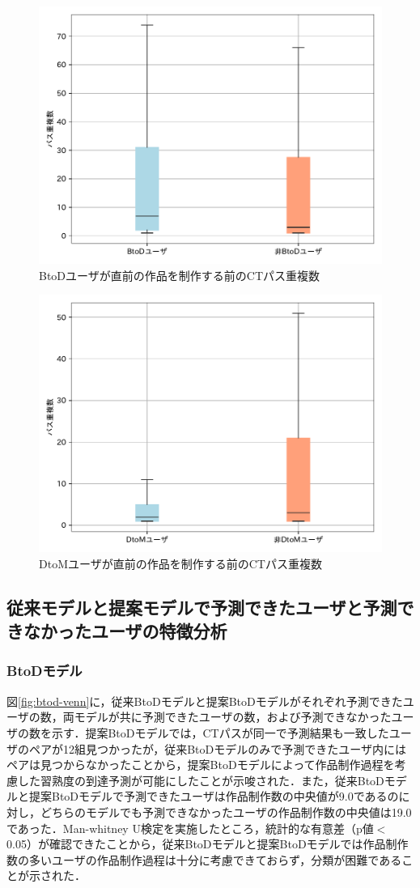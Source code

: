 \documentclass[submit,ses,noauthor]{ipsj}
\begin{document}
\begin{figure}[t]
	\centering
	\includegraphics[width=0.7\linewidth]{Okamoto_fig/add-btod.pdf}
	\caption{BtoDユーザが直前の作品を制作する前のCTパス重複数}
	\label{fig:add-btod}
\end{figure}

\begin{figure}[t]
	\centering
	\includegraphics[width=0.7\linewidth]{Okamoto_fig/add-dtom.pdf}
	\caption{DtoMユーザが直前の作品を制作する前のCTパス重複数}
	\label{fig:add-dtom}
\end{figure}



\subsection{従来モデルと提案モデルで予測できたユーザと予測できなかったユーザの特徴分析}

\subsubsection*{BtoDモデル}

図\ref{fig:btod-venn}に，従来BtoDモデルと提案BtoDモデルがそれぞれ予測できたユーザの数，両モデルが共に予測できたユーザの数，および予測できなかったユーザの数を示す．提案BtoDモデルでは，CTパスが同一で予測結果も一致したユーザのペアが12組見つかったが，従来BtoDモデルのみで予測できたユーザ内にはペアは見つからなかったことから，提案BtoDモデルによって作品制作過程を考慮した習熟度の到達予測が可能にしたことが示唆された．また，従来BtoDモデルと提案BtoDモデルで予測できたユーザは作品制作数の中央値が9.0であるのに対し，どちらのモデルでも予測できなかったユーザの作品制作数の中央値は19.0であった．Man-whitney U検定を実施したところ，統計的な有意差（p値$<$0.05）が確認できたことから，従来BtoDモデルと提案BtoDモデルでは作品制作数の多いユーザの作品制作過程は十分に考慮できておらず，分類が困難であることが示された．
\end{document}
